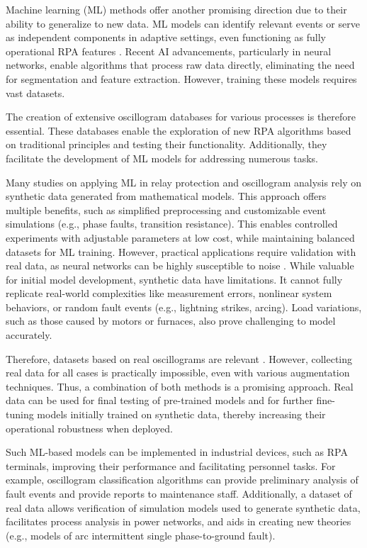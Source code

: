 \documentclass{article}
\begin{document}
Machine learning (ML) methods offer another promising direction due to their ability to generalize to new data. ML models can identify relevant events or serve as independent components in adaptive settings, even functioning as fully operational RPA features \cite{ml1, ml2, ml3}. Recent AI advancements, particularly in neural networks, enable algorithms that process raw data directly, eliminating the need for segmentation and feature extraction. However, training these models requires vast datasets.

The creation of extensive oscillogram databases for various processes is therefore essential. These databases enable the exploration of new RPA algorithms based on traditional principles and testing their functionality. Additionally, they facilitate the development of ML models for addressing numerous tasks.

Many studies on applying ML in relay protection \cite{ml4, ml5} and oscillogram analysis rely on synthetic data generated from mathematical models. This approach offers multiple benefits, such as simplified preprocessing and customizable event simulations (e.g., phase faults, transition resistance). This enables controlled experiments with adjustable parameters at low cost, while maintaining balanced datasets for ML training. However, practical applications require validation with real data, as neural networks can be highly susceptible to noise \cite{noise}. While valuable for initial model development, synthetic data have limitations. It cannot fully replicate real-world complexities like measurement errors, nonlinear system behaviors, or random fault events (e.g., lightning strikes, arcing). Load variations, such as those caused by motors or furnaces, also prove challenging to model accurately.

Therefore, datasets based on real oscillograms are relevant \cite{data2}. However, collecting real data for all cases is practically impossible, even with various augmentation techniques. Thus, a combination of both methods \cite{data3} is a promising approach. Real data can be used for final testing of pre-trained models and for further fine-tuning models initially trained on synthetic data, thereby increasing their operational robustness when deployed.

Such ML-based models can be implemented in industrial devices, such as RPA terminals, improving their performance and facilitating personnel tasks. For example, oscillogram classification algorithms can provide preliminary analysis of fault events and provide reports to maintenance staff. Additionally, a dataset of real data allows verification of simulation models used to generate synthetic data, facilitates process analysis in power networks, and aids in creating new theories (e.g., models of  arc intermittent single phase-to-ground fault).
\end{document}
